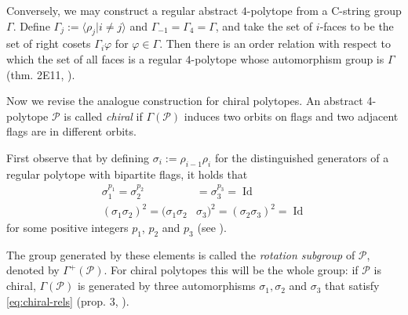 \documentclass{article}
\theoremstyle{definition}
\newcommand{\p}{\mathcal{P}}
\DeclareMathOperator{\Id}{Id}
\begin{document}
	Conversely, we may construct a regular abstract $4$-polytope from a C-string group $\Gamma$. Define $\Gamma_j:=\langle\rho_j|i\neq j\rangle$ and $\Gamma_{-1}=\Gamma_4=\Gamma$, and take the set of $i$-faces to be the set of right cosets $\Gamma_i\varphi$ for $\varphi\in\Gamma$. Then there is an order relation with respect to which the set of all faces is a regular $4$-polytope whose automorphism group is $\Gamma$ (thm. 2E11, \cite{abstract-polytopes}).
	
	\vspace{.5cm}
	
	Now we revise the analogue construction for chiral polytopes. An abstract 4-polytope $\p$ is called \textit{chiral} if $\Gamma(\p)$ induces two orbits on flags and two adjacent flags are in different orbits.
	
	First observe that by defining $\sigma_i:=\rho_{i-1}\rho_i$ for the distinguished generators of a regular polytope with bipartite flags, it holds that
	\begin{equation}\label{eq:chiral-rels}
		\begin{aligned}
			\sigma_1^{p_1}=\sigma_2^{p_2}&=\sigma_3^{p_3}=\Id\\
			(\sigma_1\sigma_2)^2=(\sigma_1\sigma_2&\sigma_3)^2=(\sigma_2\sigma_3)^2=\Id
		\end{aligned}
	\end{equation}
	for some positive integers $p_1$, $p_2$ and $p_3$ (see \cite{schulte-chiral}).
	
	The group generated by these elements is called the \textit{rotation subgroup} of $\p$, denoted by $\Gamma^+(\p)$. For chiral polytopes this will be the whole group: if $\p$ is chiral, $\Gamma(\p)$ is generated by three automorphisms $\sigma_1,\sigma_2$ and $\sigma_3$ that satisfy \cref{eq:chiral-rels} (prop. 3, \cite{schulte-chiral}).
	
\end{document}
